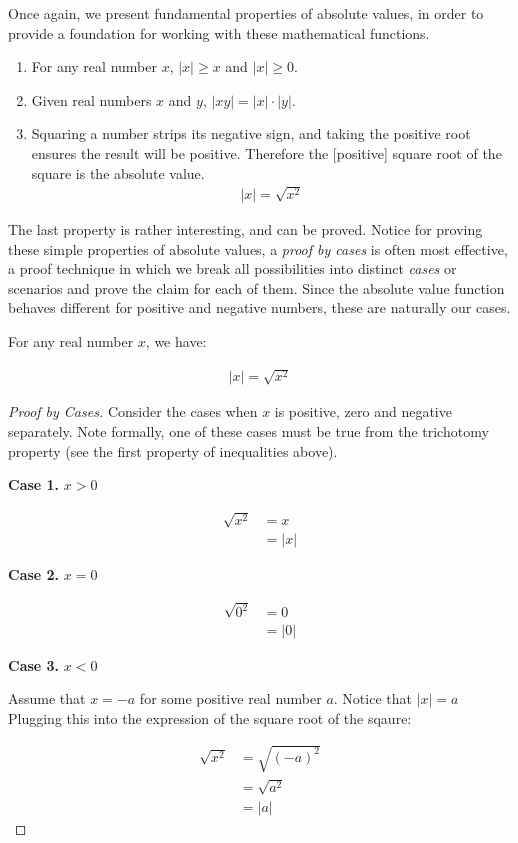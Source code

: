 \documentclass{report}
\newcommand{\header}[2]{\begin{flushright} \textbf{#1} #2 \end{flushright}}
\begin{document}
Once again, we present fundamental properties of absolute values, in order to provide a foundation for working with these mathematical functions.

\begin{enumerate}
	\item For any real number $x$, $|x| \ge x$ and $|x| \ge 0$.
	\item Given real numbers $x$ and $y$, $|xy| = |x| \cdot |y|$.
	\item Squaring a number strips its negative sign, and taking the positive root ensures the result will be positive. Therefore the [positive] square root of the square is the absolute value.
	\begin{align*}
		|x| = \sqrt{x^2}
	\end{align*}
\end{enumerate}

The last property is rather interesting, and can be proved. Notice for proving these simple properties of absolute values, a \emph{proof by cases}  is often most effective, a proof technique in which we break all possibilities into distinct \emph{cases} or scenarios and prove the claim for each of them. Since the absolute value function behaves different for positive and negative numbers, these are naturally our cases.

\vspace{\baselineskip}
\begin{theorem}
	For any real number $x$, we have:
	
	\begin{align}
		|x| = \sqrt{x^2}
	\end{align}
\end{theorem}

\begin{proof}[Proof by Cases]
	Consider the cases when $x$ is positive, zero and negative separately. Note formally, one of these cases must be true from the trichotomy property (see the first property of inequalities above).
	
	\header{Case 1.}{$x > 0$}
	
	\begin{align*}
		\sqrt{x^2} &= x \\
		&= |x|
	\end{align*}
	
	\header{Case 2.}{$x = 0$}
	
	\begin{align*}
		\sqrt{0^2} &= 0 \\
		&= |0|
	\end{align*}
	
	\header{Case 3.}{$x < 0$}
	Assume that $x = -a$ for some positive real number $a$. Notice that $|x| = a$ Plugging this into the expression of the square root of the sqaure:
	
	\begin{align*}
		\sqrt{x^2} &= \sqrt{(-a)^2} \\
		&= \sqrt{a^2} \\
		&= |a|
	\end{align*}
\end{proof}
\vspace{\baselineskip}
\end{document}

